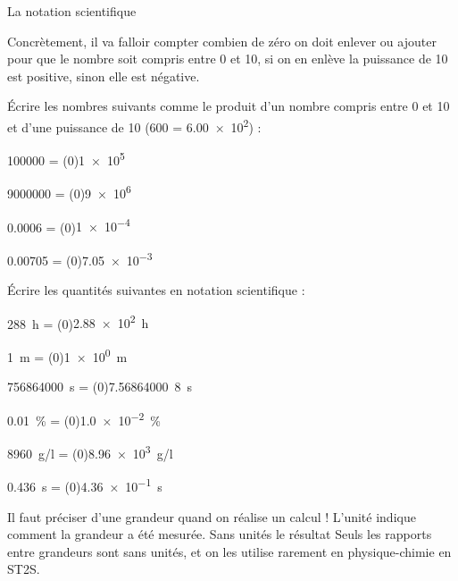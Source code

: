 \vspace*{-12pt}

\begin{doc}{La notation scientifique}
  
  
  Concrètement, il va falloir compter combien de zéro on doit enlever ou ajouter pour que le nombre soit compris entre 0 et 10, si on en enlève la puissance de 10 est positive, sinon elle est négative.
\end{doc}

\numeroQuestion Écrire les nombres suivants comme le produit d'un nombre compris entre 0 et 10 et d'une puissance de 10 (\exemple \num{600} = \num{6,00e2}) :
\pasCorrection{\vspace*{-4pt}}
\begin{listePoints}[2]
  \setlength\itemsep{-4pt}
  \item \num{100000}  = \texteTrou(0){\num{1e5}}
  \item \num{9000000} = \texteTrou(0){\num{9e6}}
  \item \num{0,0006}  = \texteTrou(0){\num{1e-4}}
  \item \num{0,00705} = \texteTrou(0){\num{7,05e-3}}
\end{listePoints}

\numeroQuestion Écrire les quantités suivantes en notation scientifique :
\begin{listePoints}[2]
  \item \qty{288}{\hour}      = \texteTrou(0){\qty{2,88e2}{\hour}\\}
  \item \qty{1}{\m}           = \texteTrou(0){\qty{1e0}{\m}\\}
  \item \qty{756 864 000}{\s} = \texteTrou(0){\qty{7,56 864 000}{8\s}\\}
  \item \qty{0,01}{\percent}  = \texteTrou(0){\qty{1,0e-2}{\percent}\\}
  \item \qty{8960}{\g/\l}     = \texteTrou(0){\qty{8,96e3}{\g/\l}\\}
  \item \qty{0,436}{\s}       = \texteTrou(0){\qty{4,36e-1}{\s}\\}
\end{listePoints}

\attention Il faut  préciser  d'une grandeur quand on réalise un calcul !
L'unité indique comment la grandeur a été mesurée.
Sans unités le résultat 
Seuls les rapports entre grandeurs sont sans unités, et on les utilise rarement en physique-chimie en ST2S.
